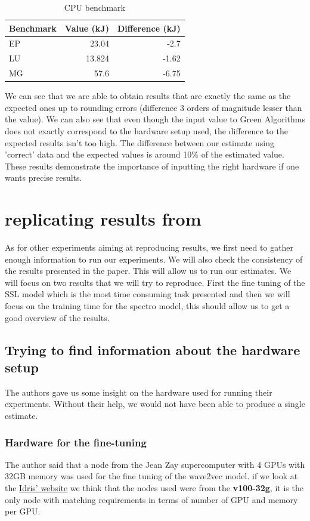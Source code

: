 \documentclass[11pt]{article}
\begin{document}
\begin{table}[htbp]
\caption{CPU benchmark}
\centering
\begin{tabular}{lrr}
Benchmark & Value (kJ) & Difference (kJ)\\
\hline
EP & 23.04 & -2.7\\
LU & 13.824 & -1.62\\
MG & 57.6 & -6.75\\
\end{tabular}
\end{table}

We can see that we are able to obtain results that are exactly the
same as the expected ones up to rounding errors (difference 3 orders of magnitude
lesser than the value). We can also see that even though the input
value to Green Algorithms does not exactly correspond to the hardware
setup used, the difference to the expected
results isn't too high. The difference between our estimate using
'correct' data and the expected values is around 10\% of the estimated value.
These results demonstrate the importance of inputting the right
hardware if one wants precise results.

\section{replicating results from \cite{Dinarelli2022toward}}
\label{sec:org8b83a9a}
\label{sec:dinarelli}
As for other experiments aiming at reproducing results, we first need
to gather enough information to run our 
experiments. We will also check the consistency of the results
presented in the paper. This will allow us to run our estimates.
We will focus on two results that we will try to reproduce. First the
fine tuning of the SSL model which is the most time consuming task
presented and then we will focus on the training time for the spectro
model, this should allow us to get a good overview of the results.

\subsection{Trying to find information about the hardware setup}
\label{sec:org7f2c916}

The authors gave us some insight on the hardware used for running
their experiments. Without their help, we would not have been able to
produce a single estimate. 

\subsubsection{Hardware for the fine-tuning}
\label{sec:org841f8bc}
The author said that a node from the Jean Zay supercomputer with 4 GPUs with
32GB memory was used for the fine tuning of the wave2vec model. if we look at the \href{http://www.idris.fr/jean-zay/cpu/jean-zay-cpu-hw.html\#gpu\_p13}{Idris' website} we
think that the nodes used were from the \textbf{v100-32g}, it is the only node
with matching requirements in terms of number of GPU and memory per
GPU.
\end{document}
